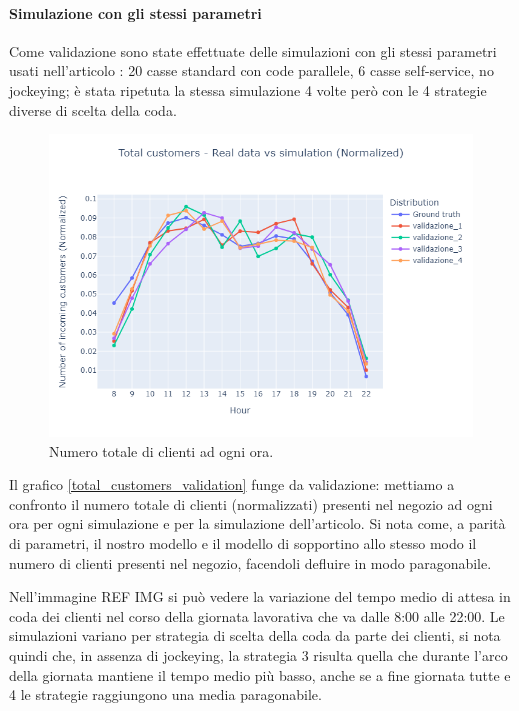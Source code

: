 \paragraph{Simulazione con gli stessi parametri}

Come validazione sono state effettuate delle simulazioni con gli stessi parametri usati nell'articolo \cite{article1}: 20 casse standard con code parallele, 6 casse self-service, no jockeying; è stata ripetuta la stessa simulazione 4 volte però con le 4 strategie diverse di scelta della coda.

\begin{figure}[htp!]
	\centering
	\includegraphics[width=12cm]{"images/results/total_customers_validation.png"}
	\caption{Numero totale di clienti ad ogni ora.}
	\label{fig:total_customers_validation}
\end{figure}

Il grafico \ref{total_customers_validation} funge da validazione: mettiamo a confronto il numero totale di clienti (normalizzati) presenti nel negozio ad ogni ora per ogni simulazione e per la simulazione dell'articolo. Si nota come, a parità di parametri, il nostro modello e il modello di \cite{article1} sopportino allo stesso modo il numero di clienti presenti nel negozio, facendoli defluire in modo paragonabile.


Nell'immagine REF IMG si può vedere la variazione del tempo medio di attesa in coda dei clienti nel corso della giornata lavorativa che va dalle 8:00 alle 22:00. Le simulazioni variano per strategia di scelta della coda da parte dei clienti, si nota quindi che, in assenza di jockeying, la strategia 3 risulta quella che durante l'arco della giornata mantiene il tempo medio più basso, anche se a fine giornata tutte e 4 le strategie raggiungono una media paragonabile.

